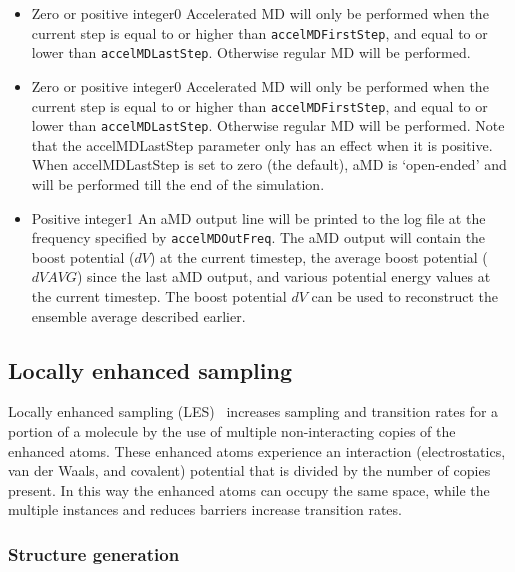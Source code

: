 \begin{itemize}
\item
{}
{Zero or positive integer}{0}
{Accelerated MD will only be performed when the current step is equal to or higher than {\tt accelMDFirstStep}, and equal to or lower than {\tt accelMDLastStep}. Otherwise regular MD will be performed.
}
\item
{}
{Zero or positive integer}{0}
{Accelerated MD will only be performed when the current step is equal to or higher than {\tt accelMDFirstStep}, and equal to or lower than {\tt accelMDLastStep}. Otherwise regular MD will be performed. Note that the accelMDLastStep parameter only has an effect when it is positive. When accelMDLastStep is set to zero (the default), aMD is `open-ended' and will be performed
till the end of the simulation. 
}

\item
{}
{Positive integer}{1}
{An aMD output line will be printed to the log file at the frequency specified by {\tt accelMDOutFreq}.
The aMD output will contain the boost potential ($dV$) at the current timestep, 
the average boost potential ($dVAVG$) since the last aMD output, and various potential energy values at the current timestep.
The boost potential $dV$ can be used to reconstruct the ensemble average described earlier.
}

\end{itemize}

\subsection{Locally enhanced sampling}
\label{section:les}

Locally enhanced sampling (LES)~\cite{ROIT91,SIMM98,SIMM00} increases
sampling and transition rates for a portion of a molecule by the use of
multiple non-interacting copies of the enhanced atoms.  These enhanced
atoms experience an interaction (electrostatics, van der Waals, and
covalent) potential that is divided by the number of copies present.
In this way the enhanced atoms can occupy the same space, while the
multiple instances and reduces barriers increase transition rates.

\subsubsection{Structure generation}

